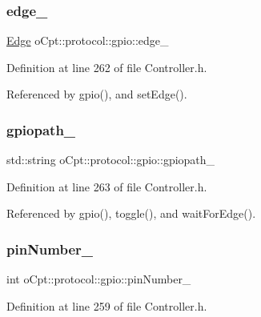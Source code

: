 \subsubsection{\texorpdfstring{edge\+\_\+}{edge\_}}
{\footnotesize\ttfamily \hyperlink{classo_cpt_1_1protocol_1_1gpio_adbbd34b2bc4394ad5a71d94641dda9f9}{Edge} o\+Cpt\+::protocol\+::gpio\+::edge\+\_\+\hspace{0.3cm}{\ttfamily [private]}}



Definition at line 262 of file Controller.\+h.



Referenced by gpio(), and set\+Edge().

\hypertarget{classo_cpt_1_1protocol_1_1gpio_afac9293096c2636fcce60aff2b38698d}{}\label{classo_cpt_1_1protocol_1_1gpio_afac9293096c2636fcce60aff2b38698d} 
\subsubsection{\texorpdfstring{gpiopath\+\_\+}{gpiopath\_}}
{\footnotesize\ttfamily std\+::string o\+Cpt\+::protocol\+::gpio\+::gpiopath\+\_\+\hspace{0.3cm}{\ttfamily [private]}}



Definition at line 263 of file Controller.\+h.



Referenced by gpio(), toggle(), and wait\+For\+Edge().

\hypertarget{classo_cpt_1_1protocol_1_1gpio_a618c388f95fff31d6decf7f8760e76a9}{}\label{classo_cpt_1_1protocol_1_1gpio_a618c388f95fff31d6decf7f8760e76a9} 
\subsubsection{\texorpdfstring{pin\+Number\+\_\+}{pinNumber\_}}
{\footnotesize\ttfamily int o\+Cpt\+::protocol\+::gpio\+::pin\+Number\+\_\+\hspace{0.3cm}{\ttfamily [private]}}



Definition at line 259 of file Controller.\+h.



